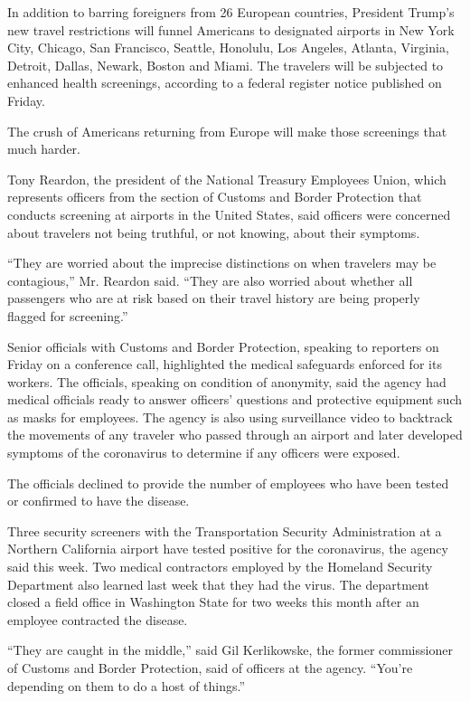 In addition to barring foreigners from 26 European countries, President
Trump's new travel restrictions will funnel Americans to designated
airports in New York City, Chicago, San Francisco, Seattle, Honolulu,
Los Angeles, Atlanta, Virginia, Detroit, Dallas, Newark, Boston and
Miami. The travelers will be subjected to enhanced health screenings,
according to a federal register notice published on Friday.

The crush of Americans returning from Europe will make those screenings
that much harder.

Tony Reardon, the president of the National Treasury Employees Union,
which represents officers from the section of Customs and Border
Protection that conducts screening at airports in the United States,
said officers were concerned about travelers not being truthful, or not
knowing, about their symptoms.

``They are worried about the imprecise distinctions on when travelers
may be contagious,'' Mr. Reardon said. ``They are also worried about
whether all passengers who are at risk based on their travel history are
being properly flagged for screening.''

Senior officials with Customs and Border Protection, speaking to
reporters on Friday on a conference call, highlighted the medical
safeguards enforced for its workers. The officials, speaking on
condition of anonymity, said the agency had medical officials ready to
answer officers' questions and protective equipment such as masks for
employees. The agency is also using surveillance video to backtrack the
movements of any traveler who passed through an airport and later
developed symptoms of the coronavirus to determine if any officers were
exposed.

The officials declined to provide the number of employees who have been
tested or confirmed to have the disease.

Three security screeners with the Transportation Security Administration
at a Northern California airport have tested positive for the
coronavirus, the agency said this week. Two medical contractors employed
by the Homeland Security Department also learned last week that they had
the virus. The department closed a field office in Washington State for
two weeks this month after an employee contracted the disease.

``They are caught in the middle,'' said Gil Kerlikowske, the former
commissioner of Customs and Border Protection, said of officers at the
agency. ``You're depending on them to do a host of things.''

